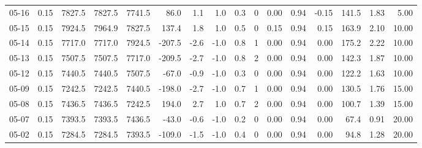 \begin{threeparttable}
{\begin{tabular}{lrrrrrrrrrrrrrrr}
  05-16 &     0.15 & 7827.5 & 7827.5 & 7741.5 &       86.0 &            1.1 &                      1.0 &                 0.3 &              0 &       0.00 &      0.94 &          -0.15 &            141.5 &            1.83 &                   5.00 \\
  05-15 &     0.15 & 7924.5 & 7964.9 & 7827.5 &      137.4 &            1.8 &                      1.0 &                 0.5 &              0 &       0.15 &      0.94 &           0.15 &            163.9 &            2.10 &                  10.00 \\
  05-14 &     0.15 & 7717.0 & 7717.0 & 7924.5 &     -207.5 &           -2.6 &                     -1.0 &                 0.8 &              1 &       0.00 &      0.94 &           0.00 &            175.2 &            2.22 &                  10.00 \\
  05-13 &     0.15 & 7507.5 & 7507.5 & 7717.0 &     -209.5 &           -2.7 &                     -1.0 &                 0.8 &              2 &       0.00 &      0.94 &           0.00 &            142.3 &            1.87 &                  10.00 \\
  05-12 &     0.15 & 7440.5 & 7440.5 & 7507.5 &      -67.0 &           -0.9 &                     -1.0 &                 0.3 &              0 &       0.00 &      0.94 &           0.00 &            122.2 &            1.63 &                  10.00 \\
  05-09 &     0.15 & 7242.5 & 7242.5 & 7440.5 &     -198.0 &           -2.7 &                     -1.0 &                 0.7 &              1 &       0.00 &      0.94 &           0.00 &            130.5 &            1.76 &                  15.00 \\
  05-08 &     0.15 & 7436.5 & 7436.5 & 7242.5 &      194.0 &            2.7 &                      1.0 &                 0.7 &              2 &       0.00 &      0.94 &           0.00 &            100.7 &            1.39 &                  15.00 \\
  05-07 &     0.15 & 7393.5 & 7393.5 & 7436.5 &      -43.0 &           -0.6 &                     -1.0 &                 0.2 &              0 &       0.00 &      0.94 &           0.00 &             67.4 &            0.91 &                  20.00 \\
  05-02 &     0.15 & 7284.5 & 7284.5 & 7393.5 &     -109.0 &           -1.5 &                     -1.0 &                 0.4 &              0 &       0.00 &      0.94 &           0.00 &             94.8 &            1.28 &                  20.00 \\

\end{tabular}}
\end{threeparttable}

